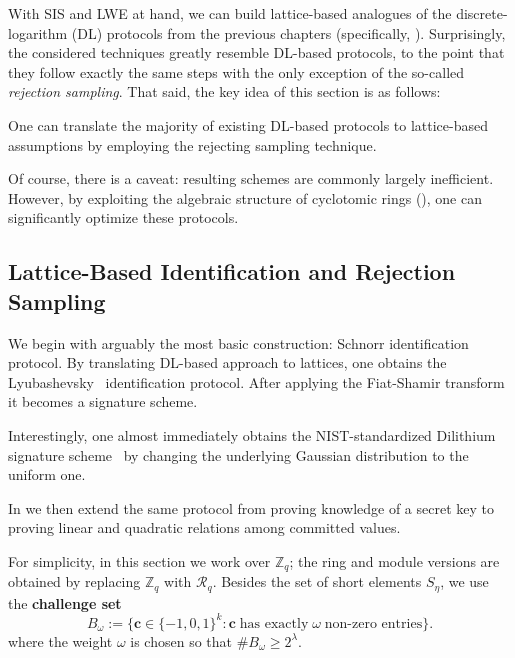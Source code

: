 \documentclass[../../book.tex]{subfiles}
\begin{document}
With SIS and LWE at hand, we can build lattice-based analogues of the discrete-logarithm (DL) protocols from the previous chapters (specifically, ).
Surprisingly, the considered techniques greatly resemble DL-based protocols, to the point that they follow exactly the same steps with the only exception of the so-called \emph{rejection sampling}.
That said, the key idea of this section is as follows:

\begin{bookquote}
    One can translate the majority of existing DL-based protocols to lattice-based assumptions by employing the rejecting sampling technique.
\end{bookquote}

Of course, there is a caveat: resulting schemes are commonly largely inefficient.
However, by exploiting the algebraic structure of cyclotomic rings (), one can significantly optimize these protocols.

\subsection{Lattice-Based Identification and Rejection Sampling}\label{section:lyubashevsky}

We begin with arguably the most basic construction: Schnorr identification protocol.
By translating DL-based approach to lattices, one obtains the Lyubashevsky~\cite{EC:Lyubashevsky12} identification protocol. 
After applying the Fiat-Shamir transform it becomes a signature scheme.

\begin{remark}
    Interestingly, one almost immediately obtains the NIST-standardized Dilithium signature scheme~\cite{TCHES:DKLLSS18} by changing the underlying Gaussian distribution to the uniform one.
\end{remark}

In  we then extend the same protocol from proving knowledge of a secret key to proving linear and quadratic relations among committed values.

For simplicity, in this section we work over $\mathbb{Z}_q$; the ring and module versions are obtained by replacing $\mathbb{Z}_q$ with $\mathcal{R}_q$.
Besides the set of short elements $S_{\eta}$, we use the \textbf{challenge set}
\begin{equation*}
    B_{\omega} := \{\mathbf{c} \in \{-1,0,1\}^k: \mathbf{c} \; \text{has exactly} \; \omega \; \text{non-zero entries}\}.
\end{equation*}
where the weight $\omega$ is chosen so that $\#B_{\omega} \geq 2^{\lambda}$.
\end{document}
